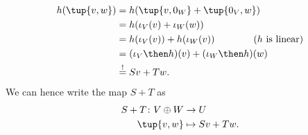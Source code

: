 \begin{example}
  \begin{equation*}
    \begin{aligned}
      h(\tup{v,w})&=h(\tup{v,0_W}+\tup{0_V,w})\\
      &=h(\iota_V(v)+\iota_W(w)) \\
      &=h(\iota_V(v))+h(\iota_W(v)) \qquad \qquad (h \text{ is linear})\\
      &=(\iota_V\then h)(v)+(\iota_W\then h)(w)\\
      &\overset{!}{=}Sv+Tw.
    \end{aligned}
  \end{equation*}
  We can hence write the map $S+T$ as
  \begin{equation*}
    \begin{aligned}
      S+T\colon V\oplus W&\to U\\
      \tup{v,w}&\mapsto Sv+Tw.
    \end{aligned}
  \end{equation*}
\end{example}
